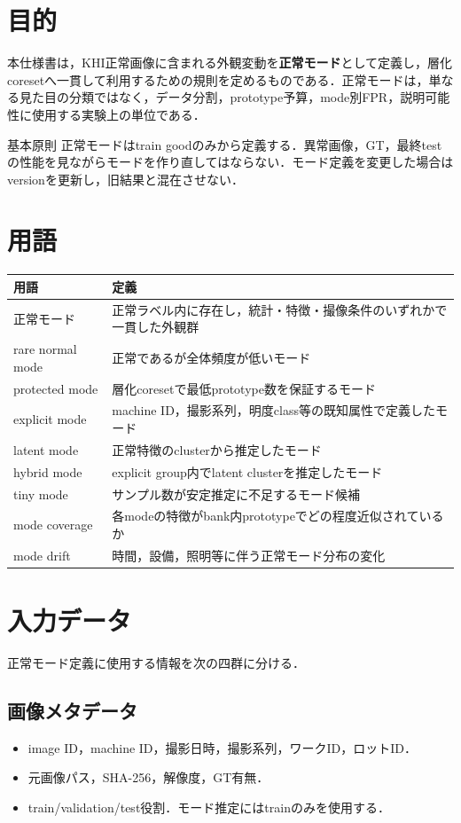 \documentclass[a4paper,11pt]{ltjsarticle}
\begin{document}

\section{目的}
本仕様書は，KHI正常画像に含まれる外観変動を\textbf{正常モード}として定義し，層化coresetへ一貫して利用するための規則を定めるものである．正常モードは，単なる見た目の分類ではなく，データ分割，prototype予算，mode別FPR，説明可能性に使用する実験上の単位である．

\begin{KhiBox}{基本原則}
正常モードはtrain goodのみから定義する．異常画像，GT，最終testの性能を見ながらモードを作り直してはならない．モード定義を変更した場合はversionを更新し，旧結果と混在させない．
\end{KhiBox}

\section{用語}
\begin{longtable}{L{42mm}Y}
\toprule
用語 & 定義 \\
\midrule
正常モード & 正常ラベル内に存在し，統計・特徴・撮像条件のいずれかで一貫した外観群 \\
rare normal mode & 正常であるが全体頻度が低いモード \\
protected mode & 層化coresetで最低prototype数を保証するモード \\
explicit mode & machine ID，撮影系列，明度class等の既知属性で定義したモード \\
latent mode & 正常特徴のclusterから推定したモード \\
hybrid mode & explicit group内でlatent clusterを推定したモード \\
tiny mode & サンプル数が安定推定に不足するモード候補 \\
mode coverage & 各modeの特徴がbank内prototypeでどの程度近似されているか \\
mode drift & 時間，設備，照明等に伴う正常モード分布の変化 \\
\bottomrule
\end{longtable}

\section{入力データ}
正常モード定義に使用する情報を次の四群に分ける．

\subsection{画像メタデータ}
\begin{itemize}
  \item image ID，machine ID，撮影日時，撮影系列，ワークID，ロットID．
  \item 元画像パス，SHA-256，解像度，GT有無．
  \item train/validation/test役割．モード推定にはtrainのみを使用する．
\end{itemize}
\end{document}
